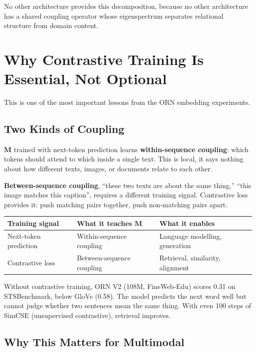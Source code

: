 \documentclass[11pt, a4paper]{article}
\newcommand{\M}{\mathbf{M}}
\theoremstyle{remark}
\begin{document}
No other architecture provides this decomposition, because no other architecture has a shared coupling operator whose eigenspectrum separates relational structure from domain content.

\section{Why Contrastive Training Is Essential, Not Optional}
\label{sec:contrastive}

This is one of the most important lessons from the ORN embedding experiments.

\subsection{Two Kinds of Coupling}

$\M$ trained with next-token prediction learns \textbf{within-sequence coupling}: which tokens should attend to which inside a single text.
This is local, it says nothing about how different texts, images, or documents relate to each other.

\textbf{Between-sequence coupling}, ``these two texts are about the same thing,'' ``this image matches this caption'', requires a different training signal.
Contrastive loss provides it: push matching pairs together, push non-matching pairs apart.

\begin{center}\small
\begin{tabular}{@{}lll@{}}
\toprule
Training signal & What it teaches $\M$ & What it enables \\
\midrule
Next-token prediction & Within-sequence coupling & Language modelling, generation \\
Contrastive loss & Between-sequence coupling & Retrieval, similarity, alignment \\
\bottomrule
\end{tabular}
\end{center}

Without contrastive training, ORN V2 (108M, FineWeb-Edu) scores 0.31 on STSBenchmark, below GloVe (0.58).
The model predicts the next word well but cannot judge whether two sentences mean the same thing.
With even 100 steps of SimCSE (unsupervised contrastive), retrieval improves.

\subsection{Why This Matters for Multimodal}
\end{document}

